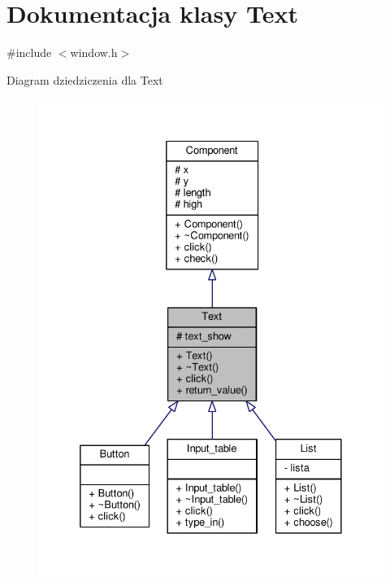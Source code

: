 \hypertarget{classText}{}\section{Dokumentacja klasy Text}
\label{classText}


{\ttfamily \#include $<$window.\+h$>$}



Diagram dziedziczenia dla Text\nopagebreak
\begin{figure}[H]
\begin{center}
\leavevmode
\includegraphics[width=332pt]{classText__inherit__graph}
\end{center}
\end{figure}


